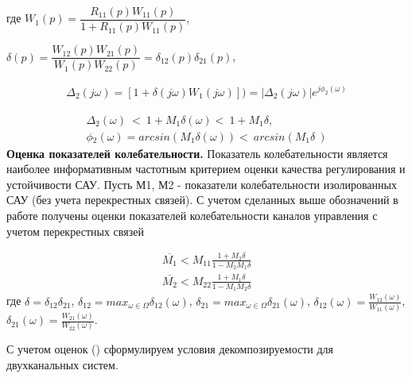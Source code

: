 где $W_{1}(p)=\dfrac{R_{11}(p)W_{11}(p)}{1+R_{11}(p)W_{11}(p)}$, 

$\delta{}(p)=\dfrac{W_{12}(p)W_{21}(p)}{W_{1}(p)W_{22}(p)}=\delta{}_{12}(p)\delta{}_{21}(p)$,

\begin{equation}
\label{eq:p2:15-}
\begin{alignedat}{2}
{\Delta{}}_2(j\omega{})=[1+\delta{}(j\omega{})W_1(j\omega{})])=\left\vert{}{\Delta{}}_2(j\omega{})\right\vert{}e^{j{\phi{}}_2(\omega{})}
\end{alignedat}
\end{equation}

\begin{equation}
\label{eq:p2:15-2}
\begin{alignedat}{2}
\Delta{}_2(\omega{})\ <\ 1+M_1\delta{}(\omega{})<\ 1+M_1\delta{},\\
\phi{}_2(\omega{})=arcsin(M_1\delta{}(\omega{}))<\ arcsin(M_1\delta{}\ )
\end{alignedat}
\end{equation}
\textbf{Оценка показателей колебательности.} \label{sec:ch2/sec5/s2}
Показатель колебательности является наиболее информативным частотным критерием оценки качества регулирования и устойчивости САУ. Пусть М1, М2 - показатели колебательности изолированных САУ (без учета перекрестных связей). С учетом сделанных выше обозначений в работе \cite[]{Karpov} получены оценки показателей колебательности каналов управления с учетом перекрестных связей

\begin{equation}
\label{eq:p2:16-}
\begin{alignedat}{2}
\overline{M_1}<M_{11}\frac{1+M_2\delta{}}{1-M_2M_1\delta{}}\\
\overline{M_2}<M_{22}\frac{1+M_1\delta{}}{1-M_1M_2\delta{}}
\end{alignedat}
\end{equation}
где 
$\delta{}={\delta{}}_{12}{\delta{}}_{21}$,
${\delta{}}_{12}=max_{\omega{}\in{}\Omega{}}{\delta{}}_{12}\left(\omega{}\right)$, 
${\delta{}}_{21}=max_{\omega{}\in{}\Omega{}}{\delta{}}_{21}\left(\omega{}\right)$,
${\delta{}}_{12}\left(\omega{}\right)=\frac{W_{12}\left(\omega{}\right)}{W_{11}\left(\omega{}\right)}$, 
${\delta{}}_{21}\left(\omega{}\right)=\frac{W_{21}\left(\omega{}\right)}{W_{22}\left(\omega{}\right)}$.

С учетом оценок () сформулируем условия декомпозируемости для двухканальных систем.

